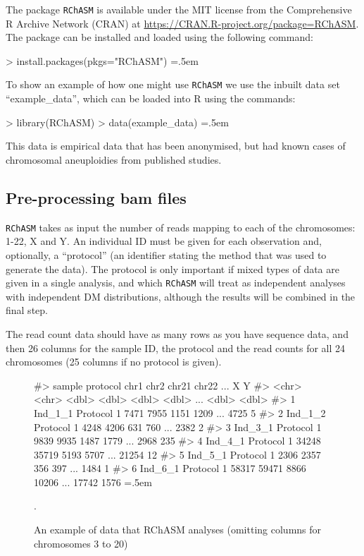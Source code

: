 \documentclass[10pt,a4paper]{article}
\newenvironment{cverbatim1}
 {\SaveVerbatim{cverb}}
 {\endSaveVerbatim
    \relsize{-1}\fboxrule=0pt\fboxsep=.5em
  \colorbox{cverbbg}{\BUseVerbatim{cverb}}%
}
\begin{document}
The package \texttt{RChASM} is available under the MIT license from the Comprehensive R Archive Network (CRAN) at \href{https://CRAN.R-project.org/package=RChASM}{https://CRAN.R-project.org/package=RChASM}. The package can  be installed and loaded using the following command:

\begin{cverbatim1}
> install.packages(pkgs="RChASM")
\end{cverbatim1}

To show an example of how one might use \texttt{RChASM} we use the inbuilt data set ``example\_data'', which can be loaded into R using the commands:

\begin{cverbatim1}
> library(RChASM)
> data(example_data)
\end{cverbatim1}

This data is empirical data that has been anonymised, but had known cases of chromosomal aneuploidies from published studies\cite{rohrlach2026chasm}.

\subsection{Pre-processing bam files}

\texttt{RChASM} takes as input the number of reads mapping to each of the chromosomes: 1-22, X and Y. An individual ID must be given for each observation and, optionally, a ``protocol'' (an identifier stating the method that was used to generate the data). The protocol is only important if mixed types of data are given in a single analysis, and which \texttt{RChASM} will treat as independent analyses with independent DM distributions, although the results will be combined in the final step.

The read count data should have as many rows as you have sequence data, and then 26 columns for the sample ID, the protocol and the read counts for all 24 chromosomes (25 columns if no protocol is given).

\begin{figure}[H]
\centering 
\begin{cverbatim1}
#>   sample  protocol    chr1  chr2 chr21 chr22 ...     X     Y
#>   <chr>   <chr>      <dbl> <dbl> <dbl> <dbl> ... <dbl> <dbl>
#> 1 Ind_1_1 Protocol 1  7471  7955  1151  1209 ...  4725     5
#> 2 Ind_1_2 Protocol 1  4248  4206   631   760 ...  2382     2
#> 3 Ind_3_1 Protocol 1  9839  9935  1487  1779 ...  2968   235
#> 4 Ind_4_1 Protocol 1 34248 35719  5193  5707 ... 21254    12
#> 5 Ind_5_1 Protocol 1  2306  2357   356   397 ...  1484     1
#> 6 Ind_6_1 Protocol 1 58317 59471  8866 10206 ... 17742  1576
\end{cverbatim1}
\caption{An example of data that RChASM analyses (omitting columns for chromosomes 3 to 20)}.
\label{fig:rchasm_code}
\end{figure}
\end{document}
